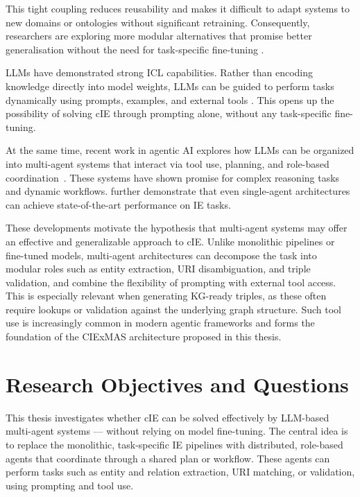 \documentclass[a4paper,oneside,bibliography=totoc]{scrbook}
\begin{document}
This tight coupling reduces reusability and makes it difficult to adapt systems to new domains or ontologies without significant retraining. Consequently, researchers are exploring more modular alternatives that promise better generalisation without the need for task-specific fine-tuning \cite{Shi2024}.

\acp{LLM} have demonstrated strong \ac{ICL} capabilities. Rather than encoding knowledge directly into model weights, \acp{LLM} can be guided to perform tasks dynamically using prompts, examples, and external tools \cite{Brown2020}. This opens up the possibility of solving \ac{cIE} through prompting alone, without any task-specific fine-tuning.

At the same time, recent work in agentic AI explores how \acp{LLM} can be organized into multi-agent systems that interact via tool use, planning, and role-based coordination~\cite{OpenAI2025,Anthropic2024,Wiesinger2025}. These systems have shown promise for complex reasoning tasks and dynamic workflows. \citet{Shi2024} further demonstrate that even single-agent architectures can achieve state-of-the-art performance on \ac{IE} tasks.

These developments motivate the hypothesis that multi-agent systems may offer an effective and generalizable approach to \ac{cIE}. Unlike monolithic pipelines or fine-tuned models, multi-agent architectures can decompose the task into modular roles such as entity extraction, URI disambiguation, and triple validation, and combine the flexibility of prompting with external tool access. This is especially relevant when generating \ac{KG}-ready triples, as these often require lookups or validation against the underlying graph structure. Such tool use is increasingly common in modern agentic frameworks \citet{OpenAI2025} and forms the foundation of the CIExMAS architecture proposed in this thesis.

\section{Research Objectives and Questions}
\label{sec:research_questions}

This thesis investigates whether \ac{cIE} can be solved effectively by \ac{LLM}-based multi-agent systems — without relying on model fine-tuning. The central idea is to replace the monolithic, task-specific IE pipelines with distributed, role-based agents that coordinate through a shared plan or workflow. These agents can perform tasks such as entity and relation extraction, URI matching, or validation, using prompting and tool use.
\end{document}
